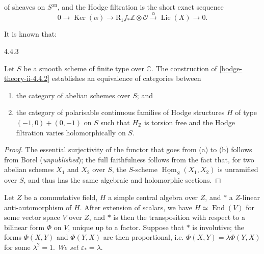     of sheaves on \(S^\mathrm {an}\), and the Hodge filtration is the short exact sequence
    \[       0       \to  \operatorname {Ker}(\alpha )       \to  \mathrm {R}_1f_*\mathbb {Z}\otimes \mathcal {O}       \xrightarrow {\alpha } \operatorname {Lie}(X)       \to  0.     \]\par{}It is known that:\begin{reminder}{4.4.3}\label{hodge-theory-ii-4.4.3}\skipsinglepar\par{}Let \(S\) be a smooth scheme of finite type over \(\mathbb {C}\).
    The construction of \cref{hodge-theory-ii-4.4.2} establishes an equivalence of categories between

    
 \begin{enumerate}
      
 \item[(a)]
        the category of abelian schemes over \(S\); and
      

      
 \item[(b)]
        the category of polarisable continuous families of Hodge structures \(H\) of type \((-1,0)+(0,-1)\) on \(S\) such that \(H_\mathbb {Z}\) is torsion free and the Hodge filtration varies holomorphically on \(S\).
      

    \end{enumerate}\begin{proof}\par{}The essential surjectivity of the functor that goes from (a) to (b) follows from Borel (\emph{unpublished});
      the full faithfulness follows from the fact that, for two abelian schemes \(X_1\) and \(X_2\) over \(S\), the \(S\)-scheme \(\underline {\operatorname {Hom}}_S(X_1,X_2)\) is unramified over \(S\), and thus has the same algebraic and holomorphic sections.\end{proof}\end{reminder}\label{hodge-theory-ii-4.4.4}\par{}Let \(Z\) be a commutative field, \(H\) a simple central algebra over \(Z\), and \(*\) a \(Z\)-linear anti-automorphism of \(H\).
    After extension of scalars, we have \(H\simeq \operatorname {End}(V)\) for some vector space \(V\) over \(Z\), and \(*\) is then the transposition with respect to a bilinear form \(\Phi \) on \(V\), unique up to a factor.
    Suppose that \(*\) is involutive;
    the forms \(\Phi (X,Y)\) and \(\Phi (Y,X)\) are then proportional, i.e. \(\Phi (X,Y)=\lambda \Phi (Y,X)\) for some \(\lambda ^2=1\).
    \emph{We set \(\varepsilon _*=\lambda \)}.
